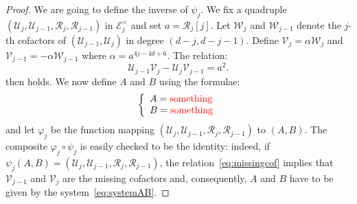 \documentclass{sig-alternate}
\begin{document}
\begin{proof} 
We are going to define the inverse of $\psi_j$. We fix a quadruple 
$(\mathcal U_j, \mathcal U_{j-1}, \mathcal R_j, \mathcal R_{j-1})$ in 
$\mathcal E_j^\times$ and set $a = \mathcal R_j[j]$.
Let $\mathcal W_j$ and $\mathcal W_{j-1}$ denote 
the $j$-th cofactors of $(\mathcal U_{j-1}, \mathcal U_j)$ in degree 
$(d{-}j, d{-}j{-}1)$. Define $\mathcal V_j = \alpha \mathcal W_j$ and 
$\mathcal V_{j-1} = -\alpha \mathcal W_{j-1}$ where $\alpha =
a^{4j-4d+6}$. The relation:
\begin{equation}
\label{eq:missingcof}
\mathcal U_{j-1} \mathcal V_j - 
\mathcal U_j \mathcal V_{j-1} = a^2.
\end{equation}
then holds. We now define $A$ and $B$ using the formulae:
\begin{equation}
\label{eq:systemAB}
\left\{\begin{array}{l}
A = \ \!\!{\color{red} \text{something}} \\
B = \ \!\!{\color{red} \text{something}} \\
\end{array}\right.
\end{equation}
and let $\varphi_j$ be the function mapping $(\mathcal U_j, \mathcal 
U_{j-1}, \mathcal R_j, \mathcal R_{j-1})$ to $(A,B)$. The composite 
$\varphi_j \circ \psi_j$ is easily checked to be the identity: indeed, 
if $\psi_j(A,B) = (\mathcal U_j, \mathcal U_{j-1}, \mathcal R_j, 
\mathcal R_{j-1})$, the relation~\eqref{eq:missingcof} implies that 
$\mathcal V_{j-1}$ and $\mathcal V_j$ are the missing cofactors and, 
consequently, $A$ and $B$ have to be given by the 
system~\eqref{eq:systemAB}.


\end{proof}
\end{document}
